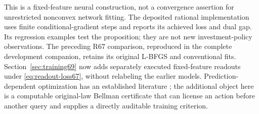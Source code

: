 This is a fixed-feature neural construction, not a convergence assertion for unrestricted nonconvex network fitting. The deposited rational implementation uses finite conditional-gradient steps and reports its achieved loss and dual gap. Its regression examples test the proposition; they are not new investment-policy observations. The preceding R67 comparison, reproduced in the complete development companion, retains its original L-BFGS and conventional fits. Section~\ref{sec:training69} now adds separately executed fixed-feature readouts under \eqref{eq:readout-loss67}, without relabeling the earlier models. Prediction-dependent optimization has an established literature \citep{sakaue2023warm,sambharya2023}; the additional object here is a computable original-law Bellman certificate that can license an action before another query and supplies a directly auditable training criterion.
